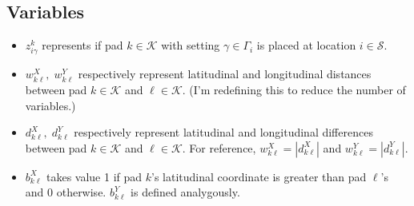 \documentclass[10pt]{article}
\newcommand{\seancomm}[1]{{\color{blue} #1}}
\begin{document}
	\subsection{Variables}
	\begin{itemize}
		\item $z_{i\gamma}^{k} $ represents if pad $ k  \in \mathcal{K}$  with setting $ \gamma \in \Gamma_i$ is placed at location $ i \in \mathcal{S}$.
		\item $ w_{k\ell}^X, \; w_{k\ell}^Y $ respectively represent latitudinal and longitudinal distances between pad $ k \in \mathcal{K}$ and $ \ell \in \mathcal{K}$. \seancomm{(I'm redefining this to reduce the number of variables.)}
		\item $ d_{k\ell}^X, \; d_{k\ell}^Y $ respectively represent latitudinal and longitudinal differences between pad $ k \in \mathcal{K}$ and $ \ell \in \mathcal{K}$. For reference, $ w_{k\ell}^X = |d_{k\ell}^X| $ and $ w_{k\ell}^Y = |d_{k\ell}^Y| $.
		\item $ b_{k\ell}^X $ takes value 1 if pad $ k $'s latitudinal coordinate is greater than pad $ \ell $'s and 0 otherwise. $ b_{k\ell}^Y $ is defined analygously.
	\end{itemize}
\end{document}
